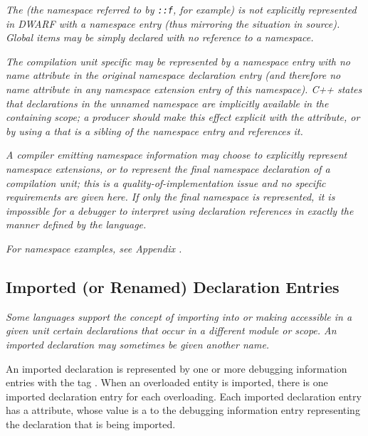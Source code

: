 \textit{The  
(the 
namespace 
referred to by
\texttt{::f}, for example) is not explicitly represented in
DWARF with a namespace entry (thus mirroring the situation
in  source).  
Global items may be simply declared with no
reference to a namespace.}

\textit{The  
compilation unit specific  may
be represented by a namespace entry with no name attribute in
the original namespace declaration entry (and therefore no name
attribute in any namespace extension entry of this namespace).
C++ states that declarations in the unnamed namespace are
implicitly available in the containing scope; a producer
should make this effect explicit with the \DWATexportsymbols{}
attribute, or by using a \DWTAGimportedmodule{} that is a
sibling of the namespace entry and references it.}

\textit{A compiler emitting namespace information may choose to
explicitly represent namespace extensions, or to represent the
final namespace declaration of a compilation unit; this is a
quality-of-implementation issue and no specific requirements
are given here. If only the final namespace is represented,
it is impossible for a debugger to interpret using declaration
references in exactly the manner defined by the 
 language.}

\textit{For  namespace examples, 
see Appendix .}


\subsection{Imported (or Renamed) Declaration Entries} 
\label{chap:importedorrenameddeclarationentries}

\textit{Some languages support the concept of importing into or 
making accessible in a given unit certain declarations that occur
in a different module or scope. An imported declaration may 
sometimes be given another name.}

An imported declaration is represented by one or
more debugging information entries with the 
tag \DWTAGimporteddeclarationTARG. 
When\hypertarget{chap:DWATimportimporteddeclaration}{}
an overloaded entity is imported, there is one imported 
declaration entry for each overloading. 
Each imported declaration entry has a
\DWATimportDEFN{} attribute,
whose value is a  to the
debugging information entry representing the declaration that
is being imported.

